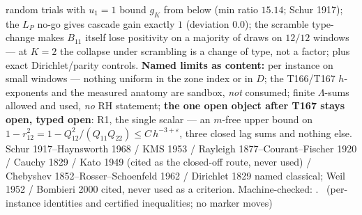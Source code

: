 random trials with $u_1=1$ bound $g_K$ from below (min ratio $15.14$;
Schur 1917); the $L_P$ no-go gives cascade gain exactly $1$ (deviation
$0.0$); the scramble type-change makes $B_{11}$ itself lose positivity
on a majority of draws on $12/12$ windows --- at $K=2$ the collapse
under scrambling is a change of type, not a factor; plus exact
Dirichlet/parity controls.
\textbf{Named limits as content:} per instance on small windows ---
nothing uniform in the zone index or in $D$; the T166/T167 $h$-exponents
and the measured anatomy are sandbox, \emph{not} consumed; finite
$\Lambda$-sums allowed and used, \emph{no} RH statement; \textbf{the one
open object after T167 stays open, typed open}: R1, the single scalar
--- an $m$-free upper bound on
$1-r_{12}^2=1-Q_{12}^2/(Q_{11}Q_{22})\le C\,h^{-3+\varepsilon}$, three
closed lag sums and nothing else.
Schur 1917--Haynsworth 1968 / KMS 1953 / Rayleigh 1877--Courant--Fischer
1920 / Cauchy 1829 / Kato 1949 (cited as the closed-off route, never
used) / Chebyshev 1852--Rosser--Schoenfeld 1962 / Dirichlet 1829 named
classical; Weil 1952 / Bombieri 2000 cited, never used as a criterion.
Machine-checked:
.
\mE\ (per-instance identities and certified inequalities; no marker moves)


